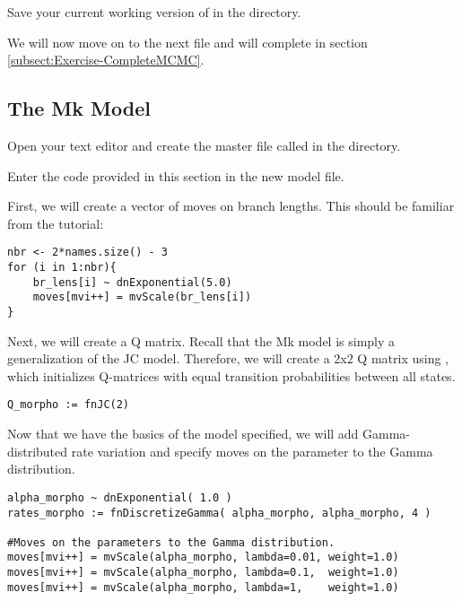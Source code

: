 {\begin{framed}
Save your current working version of  in the  directory.

We will now move on to the next \Rev file and will complete  in section \ref{subsect:Exercise-CompleteMCMC}.
\end{framed}}


\bigskip
\subsection{The Mk Model}

{\begin{framed}
Open your text editor and create the master \Rev file called {\textcolor{red}{}} in the  directory.

Enter the \Rev code provided in this section in the new model file.
\end{framed}}

First, we will create a vector of moves on branch lengths. 
This should be familiar from the  tutorial:
{\tt \begin{snugshade*}
\begin{lstlisting}
nbr <- 2*names.size() - 3
for (i in 1:nbr){
    br_lens[i] ~ dnExponential(5.0)
    moves[mvi++] = mvScale(br_lens[i]) 
}
\end{lstlisting}
\end{snugshade*}}

Next, we will create a Q matrix. 
Recall that the Mk model is simply a generalization of the JC model.
Therefore, we will create a 2x2 Q matrix using , which initializes Q-matrices with equal transition probabilities between all states.

{\tt \begin{snugshade*}
\begin{lstlisting}
Q_morpho := fnJC(2)
\end{lstlisting}
\end{snugshade*}}

Now that we have the basics of the model specified, we will add Gamma-distributed rate variation and specify moves on the parameter to the Gamma distribution.


{\tt \begin{snugshade*}
\begin{lstlisting}
alpha_morpho ~ dnExponential( 1.0 )
rates_morpho := fnDiscretizeGamma( alpha_morpho, alpha_morpho, 4 )

#Moves on the parameters to the Gamma distribution.
moves[mvi++] = mvScale(alpha_morpho, lambda=0.01, weight=1.0)
moves[mvi++] = mvScale(alpha_morpho, lambda=0.1,  weight=1.0)
moves[mvi++] = mvScale(alpha_morpho, lambda=1,    weight=1.0)
\end{lstlisting}
\end{snugshade*}}

